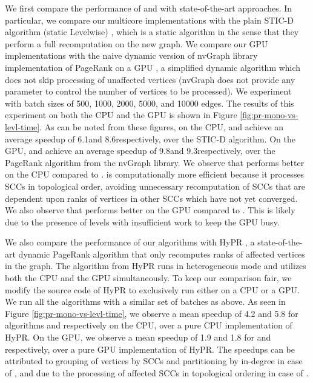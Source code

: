 We first compare the performance of \monolithicPR{} and \levelwisePR{} with state-of-the-art approaches. In particular, we compare our multicore implementations with the plain STIC-D algorithm (static Levelwise) \cite{pr-sticd16}, which is a static algorithm in the sense that they perform a full recomputation on the new graph. We compare our GPU implementations with the naive dynamic version of nvGraph library implementation of PageRank on a GPU \cite{pr-nvgraph}, a simplified dynamic algorithm which does not skip processing of unaffected vertices (nvGraph does not provide any parameter to control the number of vertices to be processed). We experiment with batch sizes of 500, 1000, 2000, 5000, and 10000 edges. The results of this experiment on both the CPU and the GPU is shown in Figure \ref{fig:pr-mono-vs-levl-time}. As can be noted from these figures, on the CPU, \monolithicPR{} and \levelwisePR{} achieve an average speedup of 6.1\x and 8.6\x respectively, over the STIC-D algorithm. On the GPU, \monolithicPR{} and \levelwisePR{} achieve an average speedup of 9.8\x and 9.3\x respectively, over the PageRank algorithm from the nvGraph library. We observe that \levelwisePR{} performs better on the CPU compared to \monolithicPR{}. \levelwisePR{} is computationally more efficient because it processes SCCs in topological order, avoiding unnecessary recomputation of SCCs that are dependent upon ranks of vertices in other SCCs which have not yet converged. We also observe that \monolithicPR{}{} performs better on the GPU compared to \levelwisePR{}. This is likely due to the presence of levels with insufficient work to keep the GPU busy.

We also compare the performance of our algorithms with HyPR \cite{pr-giri20}, a state-of-the-art dynamic PageRank algorithm that only recomputes ranks of affected vertices in the graph. The algorithm from HyPR runs in heterogeneous mode and utilizes both the CPU and the GPU simultaneously. To keep our comparison fair, we modify the source code of HyPR to exclusively run either on a CPU or a GPU. We run all the algorithms with a similar set of batches as above. As seen in Figure \ref{fig:pr-mono-vs-levl-time}, we observe a mean speedup of {4.2\x} and {5.8\x} for algorithms \monolithicPR{} and \levelwisePR{} respectively on the CPU, over a pure CPU implementation of HyPR. On the GPU, we observe a mean speedup of {1.9\x} and {1.8\x} for \monolithicPR{} and \levelwisePR{} respectively, over a pure GPU implementation of HyPR. The speedups can be attributed to grouping of vertices by SCCs and partitioning by in-degree in case of \monolithicPR{}, and due to the processing of affected SCCs in topological ordering in case of \levelwisePR{}.


